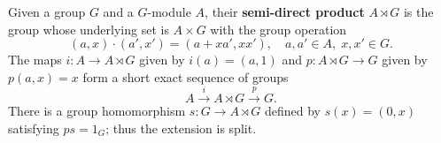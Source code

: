 Given a group $G$ and a $G$-module $A$, their \textbf{semi-direct product} $A \rtimes G$ is the group whose underlying set is $A \times G$ with the group operation
$$(a, x) \cdot (a', x') = (a + x a', x x'), \quad a, a' \in A,\; x, x' \in G.$$
The maps $i : A \to A \rtimes G$ given by $i(a) = (a, 1)$ and $p : A \rtimes G \to G$ given by $p(a, x) = x$ form a short exact sequence of groups
$$A \xrightarrow{i} A \rtimes G \xrightarrow{p} G.$$
There is a group homomorphism $s : G \to A \rtimes G$ defined by $s(x) = (0, x)$ satisfying $ps = 1_G$; thus the extension is split.
